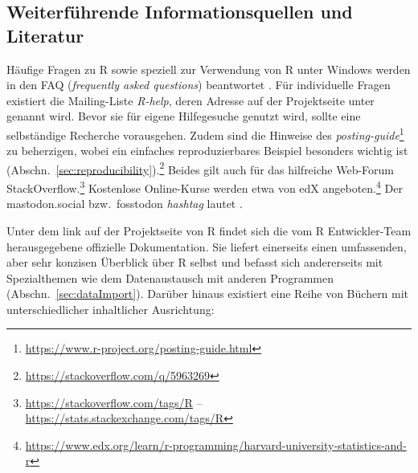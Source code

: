 \subsection{Weiterführende Informationsquellen und Literatur}
\label{sec:documentation}

Häufige Fragen zu R sowie speziell zur Verwendung von R unter Windows werden in den FAQ (\emph{frequently asked questions}) beantwortet \cite{Hornik2009, Ripley2008}. Für individuelle Fragen existiert die Mailing-Liste \emph{R-help}, deren Adresse auf der Projektseite unter  genannt wird. Bevor sie für eigene Hilfegesuche genutzt wird, sollte eine selbständige Recherche vorausgehen. Zudem sind die Hinweise des \emph{posting-guide}\footnote{\url{https://www.r-project.org/posting-guide.html}} zu beherzigen, wobei ein einfaches reproduzierbares Beispiel besonders wichtig ist (Abschn.\ \ref{sec:reproducibility}).\footnote{\url{https://stackoverflow.com/q/5963269}} Beides gilt auch für das hilfreiche Web-Forum StackOverflow.\footnote{%
\url{https://stackoverflow.com/tags/R} -- \url{https://stats.stackexchange.com/tags/R}}
Kostenlose Online-Kurse werden etwa von edX angeboten.\footnote{%
\url{https://www.edx.org/learn/r-programming/harvard-university-statistics-and-r}} Der mastodon.social bzw.\ fosstodon \emph{hashtag} lautet .


Unter dem link  auf der Projektseite von R findet sich die vom R Entwickler-Team herausgegebene offizielle Dokumentation. Sie liefert einerseits einen umfassenden, aber sehr konzisen Überblick über R selbst \cite{Venables2008} und befasst sich andererseits mit Spezialthemen wie dem Datenaustausch mit anderen Programmen (Abschn.\ \ref{sec:dataImport}). Darüber hinaus existiert eine Reihe von Büchern mit unterschiedlicher inhaltlicher Ausrichtung:

